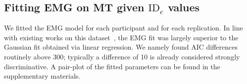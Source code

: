 \documentclass[acmlarge, manuscript,review]{acmart}
\newcommand{\ide}{\ensuremath{{\text{ID}_e}}\xspace}
\begin{document}

\subsection{Fitting EMG on MT given \ide values \label{subs:jgp:emg}}
We fitted the EMG model for each participant and for each replication. In line with existing works on this dataset~\cite{gori2018these,zhao2022}, the EMG fit was largely superior to the Gaussian fit obtained via linear regression. We namely found AIC differences routinely above 300; typically a difference of 10 is already considered strongly discriminative. A pair-plot of the fitted parameters can be found in the supplementary materials.

\end{document}
